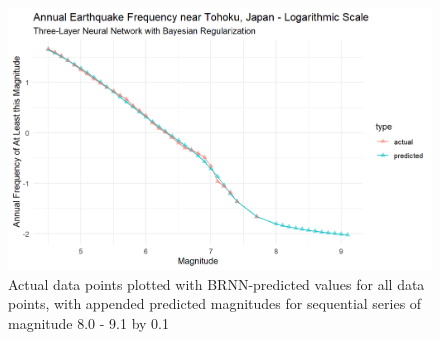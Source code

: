 \begin{figure}[H]
    \center
    \includegraphics[width=0.8\linewidth]{Figures/tohoku_logscale_brnn.png}
    \caption{\footnotesize{Actual data points plotted with BRNN-predicted values for all data points, with appended predicted magnitudes for sequential series of magnitude 8.0 - 9.1 by 0.1}}
    \label{tohoku_brnn}
\end{figure}


